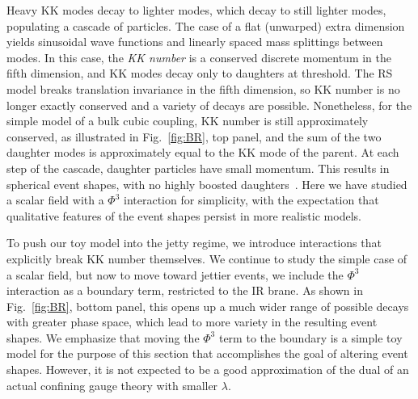 \begin{enumerate}
Heavy KK modes decay to lighter modes, which decay to still lighter modes, populating a cascade of particles. The case of a flat (unwarped) extra dimension yields sinusoidal wave functions and linearly spaced mass splittings between modes. In this case, the \emph{KK number} is a conserved discrete momentum in the fifth dimension, and KK modes decay only to daughters at threshold. The RS model breaks translation invariance in the fifth dimension, so KK number is no longer exactly conserved and a variety of decays are possible. Nonetheless, for the simple model of a bulk cubic coupling, KK number is still approximately conserved, as illustrated in Fig.~\ref{fig:BR}, top panel, and the sum of the two daughter modes is approximately equal to the KK mode of the parent. At each step of the cascade, daughter particles have small momentum. This results in spherical event shapes, with no highly boosted daughters~\cite{Csaki:2008dt}. Here we have studied a scalar field with a $\Phi^3$ interaction for simplicity, with the expectation that qualitative features of the event shapes persist in more realistic models.

To push our toy model into the jetty regime, we introduce interactions that explicitly break KK number themselves. We continue to study the simple case of a scalar field, but now to move toward jettier events, we include the $\Phi^3$ interaction as a boundary term, restricted to the IR brane. As shown in Fig.~\ref{fig:BR}, bottom panel, this opens up a much wider range of possible decays with greater phase space, which lead to more variety in the resulting event shapes. We emphasize that moving the $\Phi^3$ term to the boundary is a simple toy model for the purpose of this section that accomplishes the goal of altering event shapes. However, it is not expected to be a good approximation of the dual of an actual confining gauge theory with smaller $\lambda$.


\end{enumerate}
